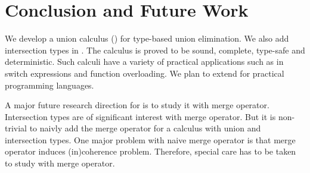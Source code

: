 \section{Conclusion and Future Work}
\label{sec:conclusion}

We develop a union calculus (\cal) for type-based union elimination. 
We also add intersection types in
\cal. The calculus is proved to be sound, complete, type-safe and deterministic.
Such calculi have a variety of practical applications such as in switch expressions
and function overloading. We plan to extend \cal for practical programming languages.

A major future research direction for \cal is to study it with merge operator.
Intersection types are of significant interest with merge operator. But it is non-trivial
to naivly add the merge operator for a calculus with union and intersection types.
One major problem with naive merge operator is that merge operator induces (in)coherence problem.
Therefore, special care has to be taken to study \cal with merge operator.
